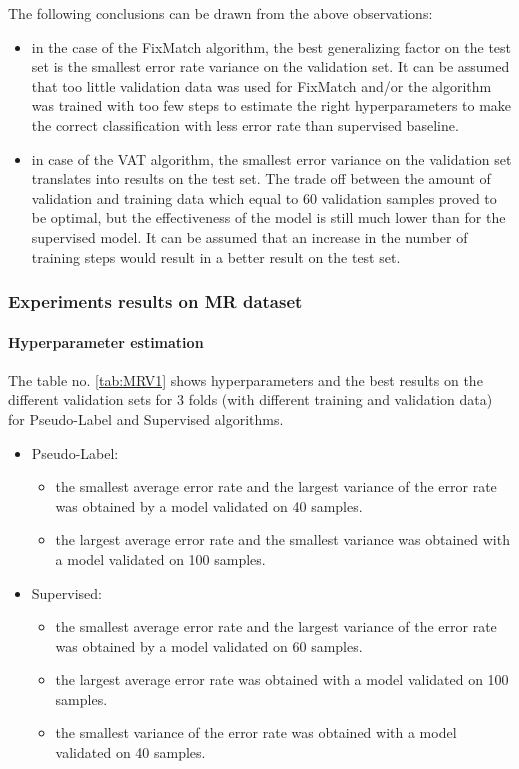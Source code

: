 \documentclass[12pt]{article}
\theoremstyle{definition}
\DeclareRobustCommand{\[}{\begin{equation}}
\DeclareRobustCommand{\]}{\end{equation}}
\begin{document}
\vspace{5mm} %
The following conclusions can be drawn from the above observations:
    \begin{itemize}
        \item in the case of the FixMatch algorithm, the best generalizing factor on the test set is the smallest error rate variance on the validation set. It can be assumed that too little validation data was used for FixMatch and/or the algorithm was trained with too few steps to estimate the right hyperparameters to make the correct classification with less error rate than supervised baseline.
        \item in case of the VAT algorithm, the smallest error variance on the validation set translates into results on the test set. The trade off between the amount of validation and training data which equal to 60 validation samples proved to be optimal, but the effectiveness of the model is still much lower than for the supervised model. It can be assumed that an increase in the number of training steps would result in a better result on the test set.
    \end{itemize}
\subsubsection{Experiments results on MR dataset}

\paragraph{Hyperparameter estimation} 
\par The table no. \ref{tab:MRV1} shows hyperparameters and the best results on the different validation sets for 3 folds (with different training and validation data) for Pseudo-Label and Supervised algorithms.
\begin{itemize}
   \item Pseudo-Label:
    \begin{itemize}
        \item the smallest average error rate and the largest variance of the error rate was obtained by a model validated on 40 samples.
        \item the largest average error rate and the smallest variance was obtained with a model validated on 100 samples.
    \end{itemize}
    \item Supervised:
    \begin{itemize}
        \item the smallest average error rate and the largest variance of the error rate was obtained by a model validated on 60 samples.
        \item the largest average error rate was obtained with a model validated on 100 samples.
        \item the smallest variance of the error rate was obtained with a model validated on 40 samples.
    \end{itemize}
\end{itemize}
\end{document}
